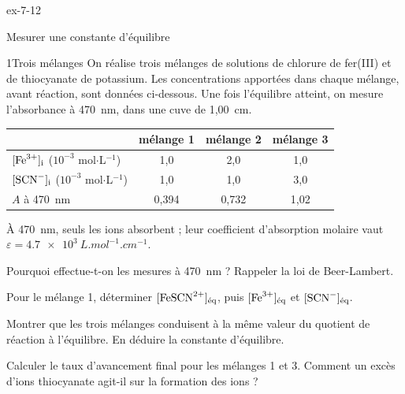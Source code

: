\begin{blocLivre}{ex-7-12}
\begin{exercice}[3]{Mesurer une constante d'équilibre}
\begin{docu}{1}{Trois mélanges}
On réalise trois mélanges de solutions de chlorure de fer(III) et de thiocyanate de potassium. Les concentrations
apportées dans chaque mélange, avant réaction, sont données ci-dessous. Une fois l'équilibre
 atteint, on mesure l'absorbance à 470~nm, dans une cuve de 1,00~cm.
\par\smallskip
{\small\renewcommand{\arraystretch}{1.2}
\begin{tabular}{@{}l*{3}{c}@{}}\toprule
 & mélange 1 & mélange 2 & mélange 3\\\midrule
$[\ce{Fe^3+}]_\mathrm{i}$ ($10^{-3}$ mol$\cdot$L$^{-1}$) & 1,0 & 2,0 & 1,0\\
$[\ce{SCN-}]_\mathrm{i}$ ($10^{-3}$ mol$\cdot$L$^{-1}$) & 1,0 & 1,0 & 3,0\\
$A$ à 470~nm & 0,394 & 0,732 & 1,02\\\bottomrule
\end{tabular}}
\end{docu}
\begin{donnees}
À 470~nm, seuls les ions  absorbent ; leur coefficient d'absorption molaire vaut
\mbox{$\varepsilon=\qty{4,7e3}{L.mol^{-1}.cm^{-1}}$}.
\end{donnees}
\begin{questions}
\item Pourquoi effectue-t-on les mesures à 470~nm ? Rappeler la loi de Beer-Lambert.
\item Pour le mélange 1, déterminer $[\ce{FeSCN^2+}]_\text{éq}$, puis $[\ce{Fe^3+}]_\text{éq}$ et $[\ce{SCN-}]_\text{éq}$.
\item \initiative Montrer que les trois mélanges conduisent à la même valeur du quotient de réaction à l'équilibre.
En déduire la constante d'équilibre.
\item Calculer le taux d'avancement final pour les mélanges 1 et 3. Comment un excès d'ions thiocyanate agit-il sur
la formation des ions  ?
\end{questions}
\end{exercice}
\end{blocLivre}
